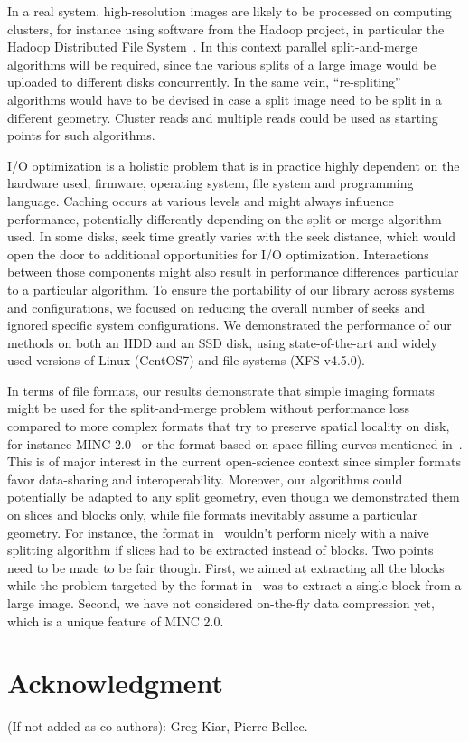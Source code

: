 \documentclass[10pt, conference, compsocconf]{IEEEtran}
\begin{document}
In a real system, high-resolution images are likely to be processed on
computing clusters, for instance using software from the Hadoop
project, in particular the Hadoop Distributed File
System~\cite{shvachko2010hadoop}. In this context parallel split-and-merge algorithms
will be required, since the various splits of a large image would be
uploaded to different disks concurrently. In the same vein,
``re-spliting'' algorithms would have to be devised in case a split
image need to be split in a different geometry. Cluster reads and
multiple reads could be used as starting points for such algorithms.

I/O optimization is a holistic problem that is in practice highly
dependent on the hardware used, firmware, operating system, file
system and programming language. Caching occurs at various levels and
might always influence performance, potentially differently depending
on the split or merge algorithm used. In some disks, seek time greatly
varies with the seek distance, which would open the door to additional
opportunities for I/O optimization. Interactions between those
components might also result in performance differences particular to
a particular algorithm. To ensure the portability of our library
across systems and configurations, we focused on reducing the overall
number of seeks and ignored specific system configurations. We
demonstrated the performance of our methods on both an HDD and an SSD
disk, using state-of-the-art and widely used versions of Linux
(CentOS7) and file systems (XFS v4.5.0).

In terms of file formats, our results demonstrate that simple imaging
formats might be used for the split-and-merge problem without
performance loss compared to more complex formats that try to preserve
spatial locality on disk, for instance MINC 2.0~\cite{vincent2016minc}
or the format based on space-filling curves mentioned
in~\cite{burns2013open}. This is of major interest in the current
open-science context since simpler formats favor data-sharing and
interoperability.  Moreover, our algorithms could potentially be
adapted to any split geometry, even though we demonstrated them on
slices and blocks only, while file formats inevitably assume a
particular geometry. For instance, the format in~\cite{burns2013open}
wouldn't perform nicely with a naive splitting algorithm if slices had
to be extracted instead of blocks.  Two points need to be made to be
fair though. First, we aimed at extracting all the blocks while the
problem targeted by the format in~\cite{burns2013open} was to extract
a single block from a large image. Second, we have not considered
on-the-fly data compression yet, which is a unique feature of MINC
2.0.


\section*{Acknowledgment}

(If not added as co-authors): Greg Kiar, Pierre Bellec.



\end{document}
